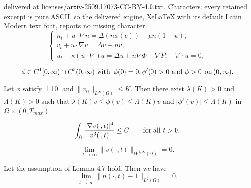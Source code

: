 \documentclass[10pt,a4paper]{amsart}
\begin{document}
delivered at licenses/arxiv-2509.17073-CC-BY-4.0.txt. Characters: every retained excerpt is pure ASCII, so the delivered engine, XeLaTeX with its default Latin Modern text font, reports no missing character.
\begin{equation}\label{1.1}
\begin{cases}
n_t+u\cdot\nabla n=\Delta (n\phi(v))+\mu n(1-n),\\
v_t+u\cdot\nabla v=\Delta v-nv,\\
u_t+ \kappa (u\cdot\nabla) u=\Delta u+n\nabla\Phi-\nabla P, \quad\nabla\cdot u=0,
\end{cases}
\end{equation}

\begin{equation}\label{1.10}
\phi\in C^1[0,\infty)\cap C^3(0,\infty)\, \, \hbox{with } \,    \phi(0)=0, \phi'(0)>0\,  \,   \hbox {and}  \,  \,  \phi>0\,  \,   \, \hbox{on}\,(0,\infty).
 \end{equation}

\begin{lemma}\label{lemma2.2}Let  $\phi$  satisfy \eqref{1.10} and $ \|v_{0}\|_{L^{\infty}(\Omega)}\leq K$. Then there exist $\lambda(K)>0$
 and $\Lambda(K)>0$ such that $\lambda(K)v\leq \phi(v)\leq \Lambda(K)v $ and $|\phi'(v)|\leq \Lambda(K)$ in $\Omega\times (0,T_{max})$.
\end{lemma}

\begin{equation}\label{4.14}
\int_\Omega \frac{|\nabla v(\cdot,t)|^4}{v^3(\cdot,t)}\le C \quad\quad \hbox{for all}\,\, t>0.
\end{equation}

 \begin{equation}\label{4.24}
\displaystyle\lim_{t\rightarrow \infty} \|v(\cdot,t)\|_{W^{1,\infty}(\Omega)} =0.
\end{equation}

\begin{lemma}\label{lemma4.9}
Let the assumption of Lemma 4.7 hold. Then  we have
 \begin{equation}\label{4.30}
\displaystyle\lim_{ \overline{t\rightarrow \infty}} \|n(\cdot,t)-1\|_{L^2(\Omega)}= 0.
\end{equation}
\end{lemma}
\end{document}
